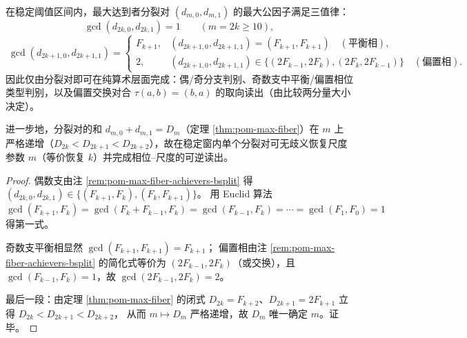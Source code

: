 \begin{corollary}\label{cor:pom-max-fiber-achievers-bsplit-gcd-trichotomy}
在稳定阈值区间内，最大达到者分裂对 \((d_{m,0},d_{m,1})\) 的最大公因子满足三值律：
\[
\boxed{\;
\gcd(d_{2k,0},d_{2k,1})=1\qquad(m=2k\ge 10),\;}
\]
\[
\boxed{\;
\gcd(d_{2k+1,0},d_{2k+1,1})
=\begin{cases}
F_{k+1},& (d_{2k+1,0},d_{2k+1,1})=(F_{k+1},F_{k+1})\quad(\text{平衡相}),\\
2,& (d_{2k+1,0},d_{2k+1,1})\in\{(2F_{k-1},2F_k),(2F_k,2F_{k-1})\}\quad(\text{偏置相}).
\end{cases}}
\]
因此仅由分裂对即可在纯算术层面完成：偶/奇分支判别、奇数支中平衡/偏置相位类型判别，以及偏置交换对合 \(\tau(a,b)=(b,a)\) 的取向读出（由比较两分量大小决定）。
\par
进一步地，分裂对的和 \(d_{m,0}+d_{m,1}=D_m\)（定理 \ref{thm:pom-max-fiber}）在 \(m\) 上严格递增（\(D_{2k}<D_{2k+1}<D_{2k+2}\)），故在稳定窗内单个分裂对可无歧义恢复尺度参数 \(m\)（等价恢复 \(k\)）并完成相位--尺度的可逆读出。
\end{corollary}
\begin{proof}
偶数支由注 \ref{rem:pom-max-fiber-achievers-bsplit} 得 \((d_{2k,0},d_{2k,1})\in\{(F_{k+1},F_k),(F_k,F_{k+1})\}\)。
用 Euclid 算法
\(
\gcd(F_{k+1},F_k)=\gcd(F_k+F_{k-1},F_k)=\gcd(F_{k-1},F_k)=\cdots=\gcd(F_1,F_0)=1
\)
得第一式。
\par
奇数支平衡相显然 \(\gcd(F_{k+1},F_{k+1})=F_{k+1}\)；
偏置相由注 \ref{rem:pom-max-fiber-achievers-bsplit} 的简化式等价为 \((2F_{k-1},2F_k)\)（或交换），且 \(\gcd(F_{k-1},F_k)=1\)，故 \(\gcd(2F_{k-1},2F_k)=2\)。
\par
最后一段：由定理 \ref{thm:pom-max-fiber} 的闭式 \(D_{2k}=F_{k+2}\)、\(D_{2k+1}=2F_{k+1}\) 立得
\(
D_{2k}<D_{2k+1}<D_{2k+2}
\)，
从而 \(m\mapsto D_m\) 严格递增，故 \(D_m\) 唯一确定 \(m\)。证毕。
\end{proof}

\endinput
